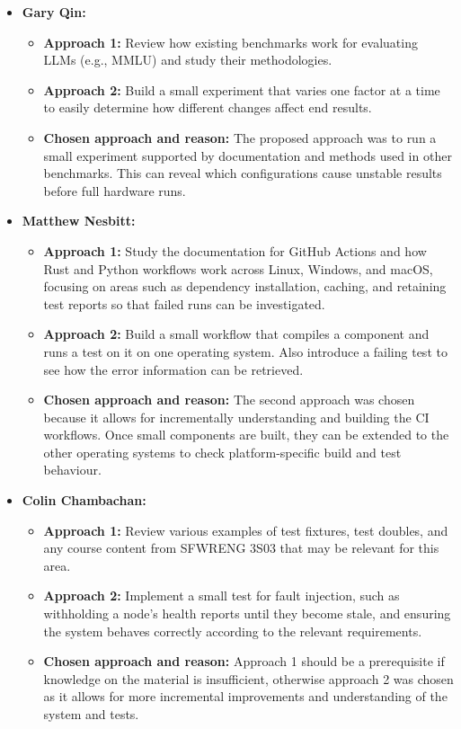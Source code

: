 \documentclass[12pt, titlepage]{article}
\begin{document}
\begin{enumerate}
\begin{itemize}
    \item \textbf{Gary Qin:}
    \begin{itemize}
      \item \textbf{Approach 1:}
      Review how existing benchmarks work for evaluating LLMs (e.g., MMLU) and study their methodologies.
      \item \textbf{Approach 2:}
      Build a small experiment that varies one factor at a time to easily determine how different changes affect end results.
      \item \textbf{Chosen approach and reason:}
      The proposed approach was to run a small experiment supported by documentation and methods used in other benchmarks. This can reveal which configurations cause unstable results before full hardware runs.
    \end{itemize}

    \item \textbf{Matthew Nesbitt:}
    \begin{itemize}
      \item \textbf{Approach 1:}
      Study the documentation for GitHub Actions and how Rust and Python workflows work across Linux, Windows, and macOS, focusing on areas such as dependency installation, caching, and retaining test reports so that failed runs can be investigated.
      \item \textbf{Approach 2:}
      Build a small workflow that compiles a component and runs a test on it on one operating system. Also introduce a failing test to see how the error information can be retrieved.
      \item \textbf{Chosen approach and reason:}
      The second approach was chosen because it allows for incrementally understanding and building the CI workflows. Once small components are built, they can be extended to the other operating systems to check platform-specific build and test behaviour.
    \end{itemize}

    \item \textbf{Colin Chambachan:}
    \begin{itemize}
      \item \textbf{Approach 1:}
      Review various examples of test fixtures, test doubles, and any course content from SFWRENG 3S03 that may be relevant for this area.
      \item \textbf{Approach 2:}
      Implement a small test for fault injection, such as withholding a node's health reports until they become stale, and ensuring the system behaves correctly according to the relevant requirements.
      \item \textbf{Chosen approach and reason:}
      Approach 1 should be a prerequisite if knowledge on the material is insufficient, otherwise approach 2 was chosen as it allows for more incremental improvements and understanding of the system and tests.
    \end{itemize}


\end{itemize}
\end{enumerate}
\end{document}
